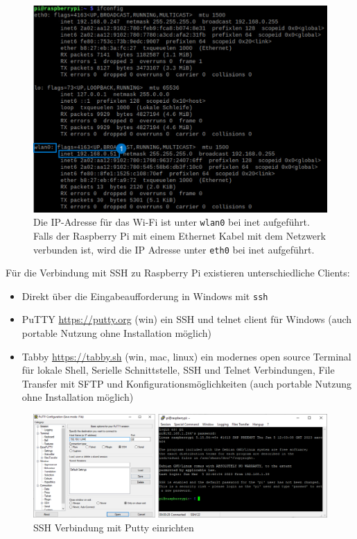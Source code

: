 \documentclass[
  11pt,
  a4paper,
  oneside, openany  ,captions=tableheading
]{scrbook}
\providecommand{\tightlist}{%
  \setlength{\itemsep}{0pt}\setlength{\parskip}{0pt}}
\theoremstyle{remark}
\begin{document}
\begin{figure}[H]

{\centering \includegraphics{images/raspberry_pi_ifconfig.png}

}

\caption{Die IP-Adresse für das Wi-Fi ist unter \texttt{wlan0} bei inet
aufgeführt. Falls der Raspberry Pi mit einem Ethernet Kabel mit dem
Netzwerk verbunden ist, wird die IP Adresse unter \texttt{eth0} bei inet
aufgeführt.}

\end{figure}%

Für die Verbindung mit SSH zu Raspberry Pi existieren unterschiedliche
Clients:

\begin{itemize}
\tightlist
\item
  Direkt über die Eingabeaufforderung in Windows mit \texttt{ssh}
\item
  PuTTY \url{https://putty.org} (win) ein SSH und telnet client für
  Windows (auch portable Nutzung ohne Installation möglich)
\item
  Tabby \url{https://tabby.sh} (win, mac, linux) ein modernes open
  source Terminal für lokale Shell, Serielle Schnittstelle, SSH und
  Telnet Verbindungen, File Transfer mit SFTP und
  Konfigurationsmöglichkeiten (auch portable Nutzung ohne Installation
  möglich)
\end{itemize}

\begin{figure}[H]

{\centering \includegraphics{images/raspberry_pi_putty.png}

}

\caption{SSH Verbindung mit Putty einrichten}

\end{figure}%
\end{document}
